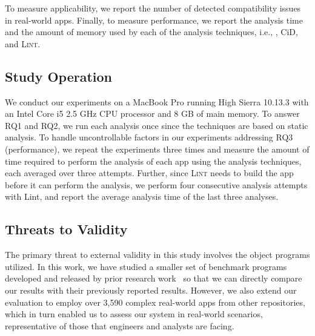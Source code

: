 



To measure applicability, we report the number of detected
compatibility issues in real-world apps. Finally, to measure
performance, we report the analysis time and the amount of memory used by each of the analysis techniques, i.e., \@approach, {\sc CiD}, and \textsc{Lint}.


\subsection{Study Operation}

We conduct our experiments on a MacBook Pro running
High Sierra 10.13.3 with an Intel Core i5 2.5 GHz CPU
processor and 8 GB of main memory. To answer RQ1 and
RQ2, we run each analysis once since the techniques are
based on static analysis.  To handle uncontrollable
factors in our experiments addressing RQ3
(performance), we repeat the experiments three times
and measure the amount of time required to perform the
analysis of each app using the analysis techniques,
each averaged over three attempts. Further, since
\textsc{Lint} needs to build the app before it can
perform the analysis, we perform four consecutive
analysis attempts with {\sc Lint}, and report the
average analysis time of the last three analyses. 


 
\subsection{Threats to Validity}

The primary threat to external validity in this study
involves the object programs utilized. In this work,
we have studied a smaller set of benchmark programs
developed and released by prior research
work~\cite{lili2018cid,huang2018understanding} so that
we can directly compare our results with their
previously reported results.  However, we also extend
our evaluation to employ over 3,590 complex real-world apps from
other repositories, which in turn enabled us to assess our system in
real-world scenarios, representative of those that
engineers and analysts are facing.

